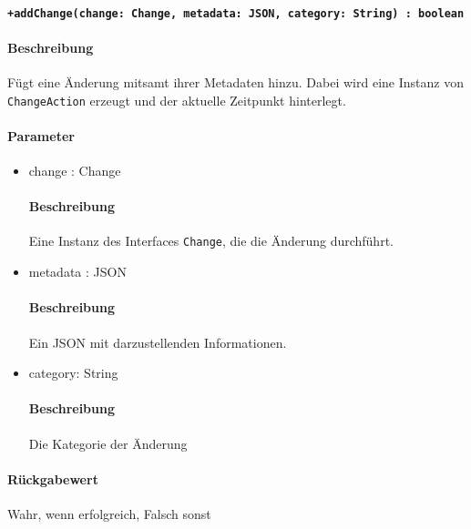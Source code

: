 \paragraph{\texttt{+addChange(change: Change, metadata: JSON, category: String) : boolean}}%
\paragraph*{Beschreibung}
Fügt eine Änderung mitsamt ihrer Metadaten hinzu.
Dabei wird eine Instanz von \verb#ChangeAction# erzeugt und der aktuelle Zeitpunkt hinterlegt.
\paragraph*{Parameter}
\begin{itemize}
    \item change : Change
            \paragraph*{Beschreibung}
            Eine Instanz des Interfaces \verb#Change#, die die Änderung durchführt.
    \item metadata : JSON
            \paragraph*{Beschreibung}
            Ein JSON mit darzustellenden Informationen.
    \item category: String
            \paragraph*{Beschreibung}
            Die Kategorie der Änderung
\end{itemize}
\paragraph*{Rückgabewert}
Wahr, wenn erfolgreich, Falsch sonst
